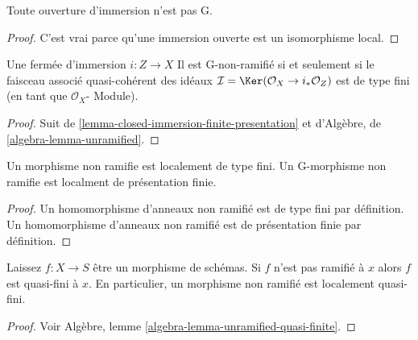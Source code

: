 \begin{lemma}

\label{lemma-open-immersion-unramified}
Toute ouverture d'immersion n'est pas G.
\end{lemma}

\begin{proof}

C'est vrai parce qu'une immersion ouverte est un isomorphisme local.

\end{proof}

\begin{lemma}

\label{lemma-closed-immersion-unramified}

Une fermée d'immersion $i : Z \to X$ Il est G-non-ramifié si et seulement si le faisceau associé quasi-cohérent des idéaux $\mathcal{I} = \Ker(\mathcal{O}_X \to i_*\mathcal{O}_Z)$
est de type fini (en tant que $\mathcal{O}_X$- Module).

\end{lemma}

\begin{proof}
Suit de \ref{lemma-closed-immersion-finite-presentation} et d'Algèbre, de \ref{algebra-lemma-unramified}.
\end{proof}

\begin{lemma}

\label{lemma-unramified-locally-finite-type}
Un morphisme non ramifie est localement de type fini. Un G-morphisme non ramifie est localment de présentation finie.
\end{lemma}

\begin{proof}

Un homomorphisme d'anneaux non ramifié est de type fini par définition. Un homomorphisme d'anneaux non ramifié est de présentation finie par définition.

\end{proof}

\begin{lemma}

\label{lemma-unramified-quasi-finite}
Laissez $f : X \to S$ être un morphisme de schémas. Si $f$ n'est pas ramifié à $x$ alors $f$ est quasi-fini à $x$. En particulier, un morphisme non ramifié est localement quasi-fini.
\end{lemma}

\begin{proof}
Voir Algèbre, lemme \ref{algebra-lemma-unramified-quasi-finite}.
\end{proof}

